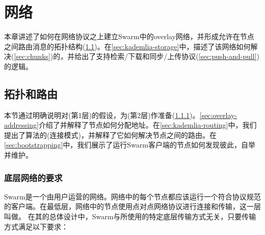 \chapter{网络}\label{sec:network}

本章讲述了如何在网络协议之上建立Swarm中的overlay网络，并形成允许在节点之间路由消息的拓扑结构(\ref{sec:topology-routing})。在\ref{sec:kademlia-storage}中，描述了该网络如何解决(\ref{sec:chunks})的，并给出了支持检索/下载和同步/上传协议(\ref{sec:push-and-pull})的逻辑。

\section{拓扑和路由\statusgreen}\label{sec:topology-routing}

本节通过明确说明对(第1层)的假设，为(第2层)作准备(\ref{sec:underlay-transport})。\ref{sec:overlay-addressing}介绍了并解释了节点如何分配地址。在\ref{sec:kademlia-routing}中，我们提出了算法的(连接模式)，并解释了它如何解决节点之间的路由。在\ref{sec:bootstrapping}中，我们展示了运行Swarm客户端的节点如何发现彼此，自举并维护。

\subsection{底层网络的要求\statusyellow}\label{sec:underlay-transport} 

\yellow{}

Swarm是一个由用户运营的网络。网络中的每个节点都应该运行一个符合协议规范的客户端。在最低层，网络中的节点使用点对点网络协议进行连接和传输，这一层叫做。
在其的总体设计中，Swarm与所使用的特定底层传输方式无关，只要传输方式满足以下要求：

